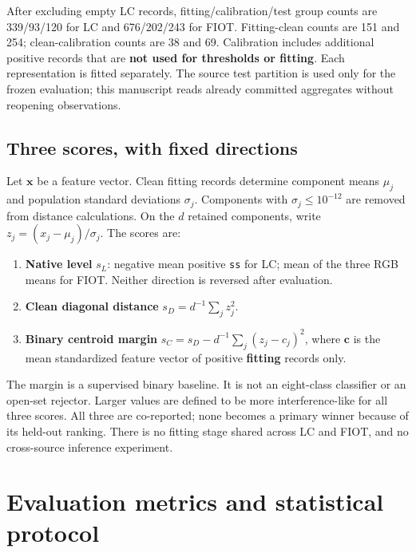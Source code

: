 \documentclass[
  10pt,
]{article}
\providecommand{\tightlist}{%
  \setlength{\itemsep}{0pt}\setlength{\parskip}{0pt}}
\begin{document}
After excluding empty LC records, fitting/calibration/test group counts
are 339/93/120 for LC and 676/202/243 for FIOT. Fitting-clean counts are
151 and 254; clean-calibration counts are 38 and 69. Calibration
includes additional positive records that are \textbf{not used for
thresholds or fitting}. Each representation is fitted separately. The
source test partition is used only for the frozen evaluation; this
manuscript reads already committed aggregates without reopening
observations.

\subsection{Three scores, with fixed
directions}\label{three-scores-with-fixed-directions}

Let \(\mathbf{x}\) be a feature vector. Clean fitting records determine
component means \(\mu_j\) and population standard deviations
\(\sigma_j\). Components with \(\sigma_j\leq10^{-12}\) are removed from
distance calculations. On the \(d\) retained components, write
\(z_j=(x_j-\mu_j)/\sigma_j\). The scores are:

\begin{enumerate}
\def\labelenumi{\arabic{enumi}.}
\tightlist
\item
  \textbf{Native level} \(s_L\): negative mean positive \texttt{ss} for
  LC; mean of the three RGB means for FIOT. Neither direction is
  reversed after evaluation.
\item
  \textbf{Clean diagonal distance} \(s_D=d^{-1}\sum_j z_j^2\).
\item
  \textbf{Binary centroid margin} \(s_C=s_D-d^{-1}\sum_j(z_j-c_j)^2\),
  where \(\mathbf{c}\) is the mean standardized feature vector of
  positive \textbf{fitting} records only.
\end{enumerate}

The margin is a supervised binary baseline. It is not an eight-class
classifier or an open-set rejector. Larger values are defined to be more
interference-like for all three scores. All three are co-reported; none
becomes a primary winner because of its held-out ranking. There is no
fitting stage shared across LC and FIOT, and no cross-source inference
experiment.

\section{Evaluation metrics and statistical
protocol}\label{evaluation-metrics-and-statistical-protocol}
\end{document}
